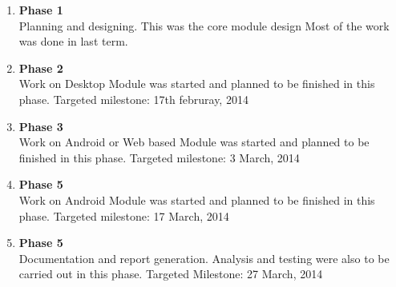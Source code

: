 \documentclass{SureshLimkar}
\begin{document}
\begin{enumerate}
 \item \textbf{Phase 1} \\Planning and designing. This was the core module design Most of the work was done in last term.
 \item \textbf{Phase 2}\\Work on Desktop Module was started and planned to be finished in this phase. Targeted milestone: 17th februray, 2014 
 \item \textbf{Phase 3}\\Work on Android or Web based Module was started and planned to be finished in this phase. Targeted milestone: 3 March, 2014
\item \textbf{Phase 5}\\Work on Android Module was started and planned to be finished in this phase. Targeted milestone: 17 March, 2014
 \item \textbf{Phase 5}\\Documentation and report generation. Analysis and testing were also to be carried out in this phase. Targeted Milestone: 27 March, 2014 \\
 
\end{enumerate}

\newpage
\end{document}
